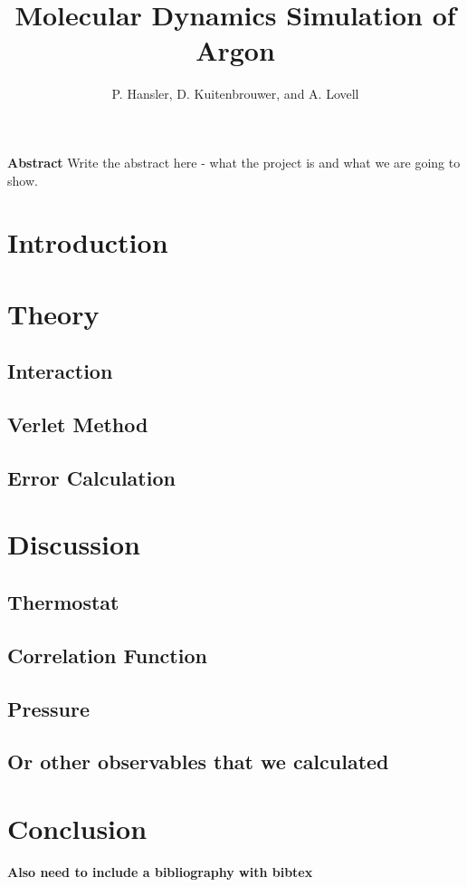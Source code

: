 \documentclass{article}
\begin{document}
\title{Molecular Dynamics Simulation of Argon}
\author{P. Hansler, D. Kuitenbrouwer, and A. Lovell}
\maketitle

\begin{center}
\textbf{Abstract}  Write the abstract here - what the project is and what we are going to show.  \\
\end{center}

\begin{multicols}{2}

\section{Introduction}

\section{Theory}
\subsection{Interaction}
\subsection{Verlet Method}
\subsection{Error Calculation}

\section{Discussion}
\subsection{Thermostat}
\subsection{Correlation Function}
\subsection{Pressure}
\subsection{Or other observables that we calculated}

\section{Conclusion}

\textbf{Also need to include a bibliography with bibtex}

\end{multicols}
\end{document}
